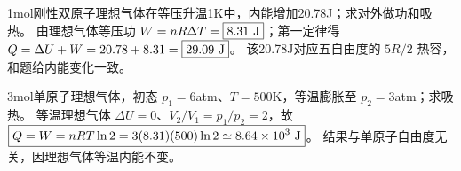 \problemtext 1mol刚性双原子理想气体在等压升温1K中，内能增加20.78J；求对外做功和吸热。
\workings 由理想气体等压功 $W=nR\Delta T=\boxed{8.31\ {\rm J}}$；第一定律得 $Q=\Delta U+W=20.78+8.31=\boxed{29.09\ {\rm J}}$。
\crosscheck 该20.78J对应五自由度的 $5R/2$ 热容，和题给内能变化一致。

\problemtext 3mol单原子理想气体，初态 $p_1=6$atm、$T=500$K，等温膨胀至 $p_2=3$atm；求吸热。
\workings 等温理想气体 $\Delta U=0$、$V_2/V_1=p_1/p_2=2$，故 $\boxed{Q=W=nRT\ln2=3(8.31)(500)\ln2\simeq8.64\times10^3\ {\rm J}}$。
\crosscheck 结果与单原子自由度无关，因理想气体等温内能不变。
